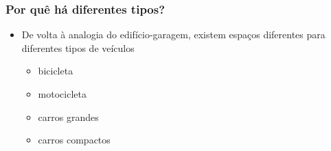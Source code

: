 \documentclass[xcolor={dvipsnames,table},aspectratio=169]{beamer}
\begin{document}
\begin{frame}\frametitle{Por quê há diferentes tipos?}
\begin{itemize}
	\item De volta à analogia do edifício-garagem, existem espaços diferentes para diferentes tipos de veículos
	\begin{itemize}
		\item bicicleta
		\item motocicleta
		\item carros grandes
		\item carros compactos
	\end{itemize}
\end{itemize}
\end{frame}

\end{document}
